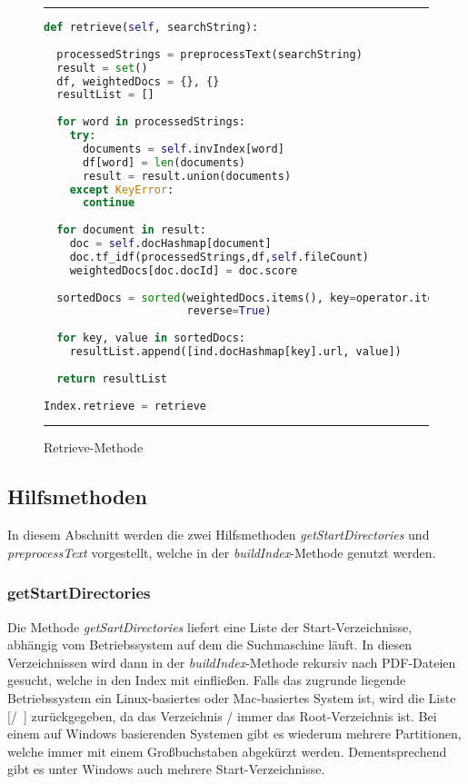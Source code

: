\begin{figure}
	\rule{\textwidth}{0.4pt}
	\begin{lstlisting}[language=Python]
def retrieve(self, searchString):
	
  processedStrings = preprocessText(searchString)
  result = set()
  df, weightedDocs = {}, {}
  resultList = []
	
  for word in processedStrings:
    try:
      documents = self.invIndex[word]
      df[word] = len(documents)
      result = result.union(documents)
    except KeyError:
      continue
	
  for document in result:
    doc = self.docHashmap[document]
    doc.tf_idf(processedStrings,df,self.fileCount)
    weightedDocs[doc.docId] = doc.score
	
  sortedDocs = sorted(weightedDocs.items(), key=operator.itemgetter(1),
                      reverse=True)
	
  for key, value in sortedDocs:
    resultList.append([ind.docHashmap[key].url, value])
	
  return resultList
	
Index.retrieve = retrieve
	\end{lstlisting}
	\rule{\textwidth}{0.4pt}
	\caption{Retrieve-Methode}
	\label{fig:retrieve}
\end{figure}


\subsection{Hilfsmethoden}\label{hilfsmethoden}

In diesem Abschnitt werden die zwei Hilfsmethoden \textit{getStartDirectories} und \textit{preprocessText} vorgestellt, welche in der \textit{buildIndex}-Methode genutzt werden.

\subsubsection{getStartDirectories}

Die Methode \textit{getSartDirectories} liefert eine Liste der Start-Verzeichnisse, abhängig vom Betriebssystem auf dem die Suchmaschine läuft. In diesen Verzeichnissen wird dann in der \textit{buildIndex}-Methode rekursiv nach PDF-Dateien gesucht, welche in den Index mit einfließen. Falls das zugrunde liegende Betriebssystem ein Linux-basiertes oder Mac-basiertes System ist, wird die Liste [\glqq /\grqq\ ] zurückgegeben, da das Verzeichnis / immer das Root-Verzeichnis ist. Bei einem auf Windows basierenden Systemen gibt es wiederum mehrere Partitionen, welche immer mit einem Großbuchstaben abgekürzt werden. Dementsprechend gibt es unter Windows auch mehrere Start-Verzeichnisse.

